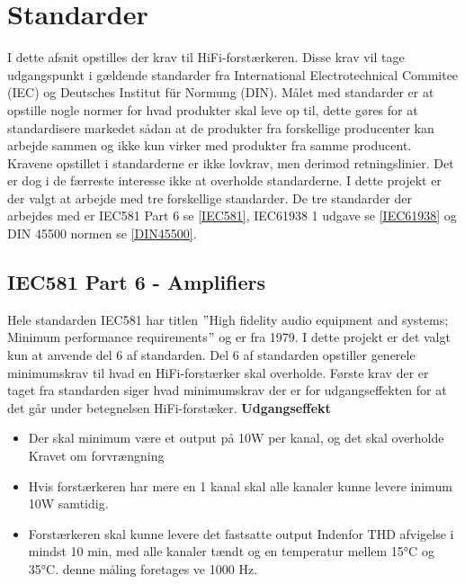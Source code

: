 \section{Standarder}
I dette afsnit opstilles der krav til HiFi-forstærkeren. Disse krav vil tage udgangspunkt i gældende standarder fra International Electrotechnical Commitee (IEC) og Deutsches Institut f\"{u}r Normung (DIN). Målet med standarder er at opstille nogle normer for hvad produkter skal leve op til, dette gøres for at standardisere markedet sådan at de produkter fra forskellige producenter kan arbejde sammen og ikke kun virker med produkter fra samme producent. Kravene opstillet i standarderne er ikke lovkrav, men derimod retningslinier. Det er dog i de færreste interesse ikke at overholde standarderne.
\newline
\newline
I dette projekt er der valgt at arbejde med tre forskellige standarder. De tre standarder der arbejdes med er IEC581 Part 6 se \ref{IEC581}, IEC61938 1 udgave se \ref{IEC61938} og DIN 45500 normen se \ref{DIN45500}.


\subsection*{IEC581 Part 6 - Amplifiers}
\label{IEC581}
Hele standarden IEC581 har titlen $"$High fidelity audio equipment and systems; Minimum performance requirements$"$ og er fra 1979. I dette projekt er det valgt kun at anvende del 6 af standarden. Del 6 af standarden opstiller generele minimumskrav til hvad en HiFi-forstærker skal overholde.
\newline
\newline
Første krav der er taget fra standarden siger hvad minimumskrav der er for udgangseffekten for at det går under betegnelsen HiFi-forstæker. 
\newline
\newline
\textbf{Udgangseffekt}
\begin{itemize}
\item Der skal minimum være et output på 10W per kanal, og det skal overholde Kravet om forvrængning
\item Hvis forstærkeren har mere en 1 kanal skal alle kanaler kunne levere inimum 10W samtidig.
\item Forstærkeren skal kunne levere det fastsatte output Indenfor THD afvigelse i mindst 10 min, med alle kanaler tændt og en temperatur mellem 15°C og 35°C. denne måling foretages ve 1000 Hz.
\end{itemize}

